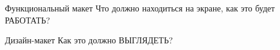 \documentclass[aspectratio=169,handout,bigger]{beamer}
\begin{document}

\begin{frame}{Функциональный макет}
  Что должно находиться на экране, как это будет РАБОТАТЬ?

\end{frame}


\begin{frame}{Дизайн-макет}
  Как это должно ВЫГЛЯДЕТЬ?

\end{frame}

\end{document}
